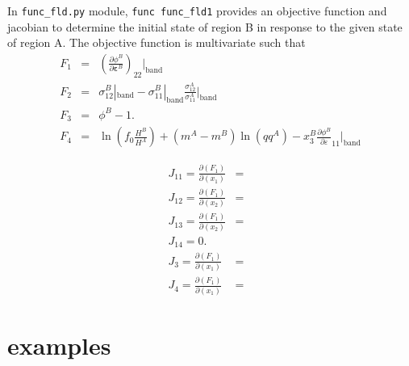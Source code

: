 \documentclass[12pt]{amsart}
\begin{document}
In \verb|func_fld.py| module, \verb|func func_fld1| provides an objective function and jacobian to determine the initial state of region B in response to the given state of region A.
The objective function is multivariate such that
\begin{eqnarray}
  \label{eq:objf_func_fld1}
  F_1&=& (\frac{\partial \phi^B}{\partial \boldsymbol{\varepsilon}^B})_{22}|_\text{band}\\
  F_2&=& \sigma_{12}^B|_\text{band}- \sigma_{11}^B|_\text{band} \frac{\sigma_{12}^A}{\sigma_{11}^A}|_\text{band}\\
  F_3&=& \phi^B- 1. \\
  F_4&=& \ln(f_0 \frac{H^B}{H^A}) + (m^A-m^B) \ln(qq^A) - x_3^B \frac{\partial \phi^B}{\partial \varepsilon}_{11}|_\text{band}
\end{eqnarray}



\begin{eqnarray}
  \label{eq:jacob_func_fld1}
  J_{11}=\frac{\partial(F_1)}{\partial(x_1)}&=&  \\
  J_{12}=\frac{\partial(F_1)}{\partial(x_2)}&=&   \\
  J_{13}=\frac{\partial(F_1)}{\partial(x_2)}&=&   \\
  J_{14}=0.                                 &&    \\
  J_{3}=\frac{\partial(F_1)}{\partial(x_1)}&=&    \\
  J_{4}=\frac{\partial(F_1)}{\partial(x_1)}&=&
\end{eqnarray}
%

% 
%




\section{examples}
\end{document}
